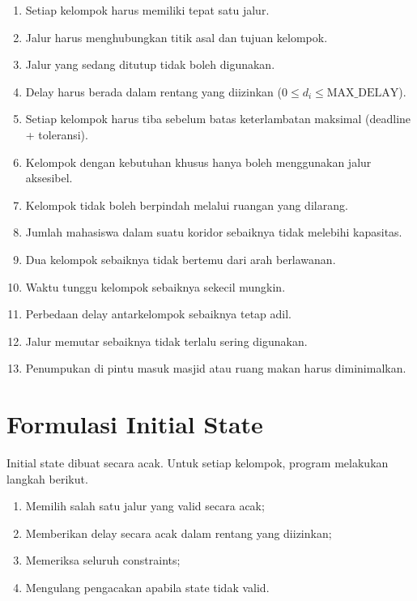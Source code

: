 \documentclass[11pt,a4paper]{article}
\begin{document}
\begin{enumerate}[leftmargin=2em,itemsep=0.1em]
  \item Setiap kelompok harus memiliki tepat satu jalur.
  \item Jalur harus menghubungkan titik asal dan tujuan kelompok.
  \item Jalur yang sedang ditutup tidak boleh digunakan.
  \item Delay harus berada dalam rentang yang diizinkan ($0 \le d_i \le \text{MAX\_DELAY}$).
  \item Setiap kelompok harus tiba sebelum batas keterlambatan maksimal (deadline + toleransi).
  \item Kelompok dengan kebutuhan khusus hanya boleh menggunakan jalur aksesibel.
  \item Kelompok tidak boleh berpindah melalui ruangan yang dilarang.
  \item Jumlah mahasiswa dalam suatu koridor sebaiknya tidak melebihi kapasitas.
  \item Dua kelompok sebaiknya tidak bertemu dari arah berlawanan.
  \item Waktu tunggu kelompok sebaiknya sekecil mungkin.
  \item Perbedaan delay antarkelompok sebaiknya tetap adil.
  \item Jalur memutar sebaiknya tidak terlalu sering digunakan.
  \item Penumpukan di pintu masuk masjid atau ruang makan harus diminimalkan.
\end{enumerate}

\section{Formulasi Initial State}

Initial state dibuat secara acak. Untuk setiap kelompok, program melakukan langkah berikut.

\begin{enumerate}[leftmargin=2em,itemsep=0.1em]
  \item Memilih salah satu jalur yang valid secara acak;
  \item Memberikan delay secara acak dalam rentang yang diizinkan;
  \item Memeriksa seluruh constraints;
  \item Mengulang pengacakan apabila state tidak valid.
\end{enumerate}
\end{document}
